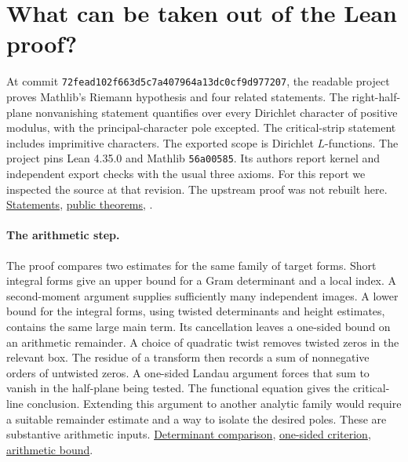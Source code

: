 \documentclass[11pt,letterpaper]{article}
\newcommand{\source}[2]{\href{https://github.com/lsernau/grh-lean/blob/72fead102f663d5c7a407964a13dc0cf9d977207/grh/src/#1}{#2}}
\begin{document}
\section{What can be taken out of the Lean proof?}
At commit \texttt{72fead102f663d5c7a407964a13dc0cf9d977207}, the readable project proves Mathlib's Riemann hypothesis and four related statements. The right-half-plane nonvanishing statement quantifies over every Dirichlet character of positive modulus, with the principal-character pole excepted. The critical-strip statement includes imprimitive characters. The exported scope is Dirichlet $L$-functions. The project pins Lean 4.35.0 and Mathlib \texttt{56a00585}. Its authors report kernel and independent export checks with the usual three axioms. For this report we inspected the source at that revision. The upstream proof was not rebuilt here. \source{Statements.lean}{Statements}, \source{Main.lean}{public theorems}, \cite{lean}.

\paragraph{The arithmetic step.}
The proof compares two estimates for the same family of target forms. Short integral forms give an upper bound for a Gram determinant and a local index. A second-moment argument supplies sufficiently many independent images. A lower bound for the integral forms, using twisted determinants and height estimates, contains the same large main term. Its cancellation leaves a one-sided bound on an arithmetic remainder. A choice of quadratic twist removes twisted zeros in the relevant box. The residue of a transform then records a sum of nonnegative orders of untwisted zeros. A one-sided Landau argument forces that sum to vanish in the half-plane being tested. The functional equation gives the critical-line conclusion. Extending this argument to another analytic family would require a suitable remainder estimate and a way to isolate the desired poles. These are substantive arithmetic inputs. \source{New/Reduction/MainInequality.lean}{Determinant comparison}, \source{New/Reduction/Zeros/Criterion.lean}{one-sided criterion}, \source{New/Reduction/OneSidedBound.lean}{arithmetic bound}.
\end{document}
